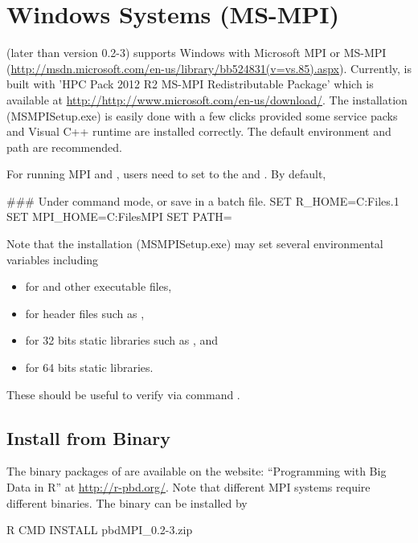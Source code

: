 

\section[Windows Systems (MS-MPI)]{Windows Systems (MS-MPI)}
\label{sec:windows_systems_msmpi}

 (later than version 0.2-3) supports Windows with
Microsoft MPI or MS-MPI
(\url{http://msdn.microsoft.com/en-us/library/bb524831(v=vs.85).aspx}).
Currently,  is built with
'HPC Pack 2012 R2 MS-MPI Redistributable Package' which is available
at \url{http://http://www.microsoft.com/en-us/download/}.
The installation (MSMPISetup.exe) is easily done with a few clicks
provided some service packs and Visual C++ runtime are installed correctly.
The default environment and path are recommended.

For running MPI and , users need to set  to the
 and . By default,
\begin{Command}
### Under command mode, or save in a batch file.
SET R_HOME=C:\Program Files\R{}.1
SET MPI_HOME=C:\Program Files\Microsoft MPI
SET PATH=%
\end{Command}

Note that the installation (MSMPISetup.exe) may set
several environmental variables including
\begin{itemize}
\item {} for  and other executable files,
\item {} for header files such as ,
\item {} for 32 bits static libraries such as ,
      and
\item {} for 64 bits static libraries.
\end{itemize}
These should be useful to verify via  command .


\subsection[Install from Binary]{Install from Binary}
\label{sec:install_from_binary}

The binary packages of  are available on the website:
``Programming with Big Data in R'' at
\url{http://r-pbd.org/}.
Note that different MPI systems require different binaries.
The binary can be installed by
\begin{Command}
R CMD INSTALL pbdMPI_0.2-3.zip
\end{Command}

